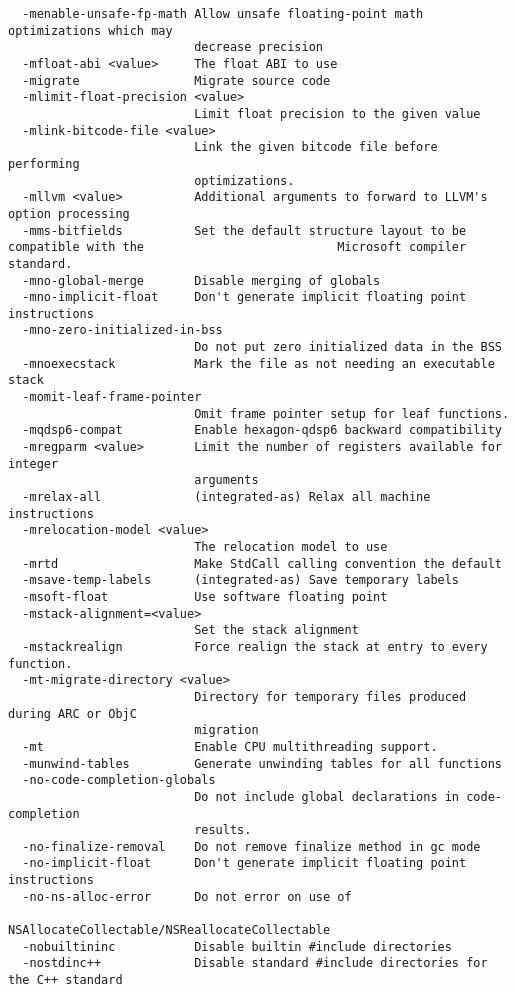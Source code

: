 \begin{verbatim}
  -menable-unsafe-fp-math Allow unsafe floating-point math optimizations which may 
                          decrease precision
  -mfloat-abi <value>     The float ABI to use
  -migrate                Migrate source code
  -mlimit-float-precision <value>
                          Limit float precision to the given value
  -mlink-bitcode-file <value>
                          Link the given bitcode file before performing 
                          optimizations.
  -mllvm <value>          Additional arguments to forward to LLVM's option processing
  -mms-bitfields          Set the default structure layout to be compatible with the                           Microsoft compiler standard.
  -mno-global-merge       Disable merging of globals
  -mno-implicit-float     Don't generate implicit floating point instructions
  -mno-zero-initialized-in-bss
                          Do not put zero initialized data in the BSS
  -mnoexecstack           Mark the file as not needing an executable stack
  -momit-leaf-frame-pointer
                          Omit frame pointer setup for leaf functions.
  -mqdsp6-compat          Enable hexagon-qdsp6 backward compatibility
  -mregparm <value>       Limit the number of registers available for integer 
                          arguments
  -mrelax-all             (integrated-as) Relax all machine instructions
  -mrelocation-model <value>
                          The relocation model to use
  -mrtd                   Make StdCall calling convention the default
  -msave-temp-labels      (integrated-as) Save temporary labels
  -msoft-float            Use software floating point
  -mstack-alignment=<value>
                          Set the stack alignment
  -mstackrealign          Force realign the stack at entry to every function.
  -mt-migrate-directory <value>
                          Directory for temporary files produced during ARC or ObjC 
                          migration
  -mt                     Enable CPU multithreading support.
  -munwind-tables         Generate unwinding tables for all functions
  -no-code-completion-globals
                          Do not include global declarations in code-completion 
                          results.
  -no-finalize-removal    Do not remove finalize method in gc mode
  -no-implicit-float      Don't generate implicit floating point instructions
  -no-ns-alloc-error      Do not error on use of 
                          NSAllocateCollectable/NSReallocateCollectable
  -nobuiltininc           Disable builtin #include directories
  -nostdinc++             Disable standard #include directories for the C++ standard 

\end{verbatim}
